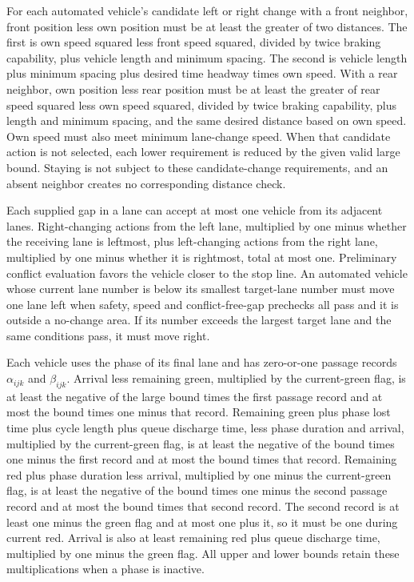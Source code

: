 \documentclass[10pt]{article}
\begin{document}
For each automated vehicle's candidate left or right change with a front neighbor, front position less own position must be at least the greater of two distances. The first is own speed squared less front speed squared, divided by twice braking capability, plus vehicle length and minimum spacing. The second is vehicle length plus minimum spacing plus desired time headway times own speed. With a rear neighbor, own position less rear position must be at least the greater of rear speed squared less own speed squared, divided by twice braking capability, plus length and minimum spacing, and the same desired distance based on own speed. Own speed must also meet minimum lane-change speed. When that candidate action is not selected, each lower requirement is reduced by the given valid large bound. Staying is not subject to these candidate-change requirements, and an absent neighbor creates no corresponding distance check.

Each supplied gap in a lane can accept at most one vehicle from its adjacent lanes. Right-changing actions from the left lane, multiplied by one minus whether the receiving lane is leftmost, plus left-changing actions from the right lane, multiplied by one minus whether it is rightmost, total at most one. Preliminary conflict evaluation favors the vehicle closer to the stop line. An automated vehicle whose current lane number is below its smallest target-lane number must move one lane left when safety, speed and conflict-free-gap prechecks all pass and it is outside a no-change area. If its number exceeds the largest target lane and the same conditions pass, it must move right.

Each vehicle uses the phase of its final lane and has zero-or-one passage records $\alpha_{ijk}$ and $\beta_{ijk}$. Arrival less remaining green, multiplied by the current-green flag, is at least the negative of the large bound times the first passage record and at most the bound times one minus that record. Remaining green plus phase lost time plus cycle length plus queue discharge time, less phase duration and arrival, multiplied by the current-green flag, is at least the negative of the bound times one minus the first record and at most the bound times that record. Remaining red plus phase duration less arrival, multiplied by one minus the current-green flag, is at least the negative of the bound times one minus the second passage record and at most the bound times that second record. The second record is at least one minus the green flag and at most one plus it, so it must be one during current red. Arrival is also at least remaining red plus queue discharge time, multiplied by one minus the green flag. All upper and lower bounds retain these multiplications when a phase is inactive.
\end{document}

